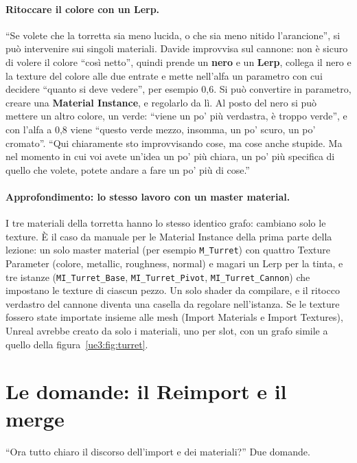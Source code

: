 \paragraph{Ritoccare il colore con un Lerp.} ``Se volete che la torretta sia meno
lucida, o che sia meno nitido l'arancione'', si può intervenire sui singoli materiali.
Davide improvvisa sul cannone: non è sicuro di volere il colore ``così netto'', quindi
prende un \textbf{nero} e un \textbf{Lerp}, collega il nero e la texture del colore alle
due entrate e mette nell'alfa un parametro con cui decidere ``quanto si deve vedere'',
per esempio 0,6. Si può convertire in parametro, creare una \textbf{Material
Instance}, e regolarlo da lì. Al posto del nero si può mettere un altro colore, un
verde: ``viene un po' più verdastra, è troppo verde'', e con l'alfa a 0,8 viene ``questo
verde mezzo, insomma, un po' scuro, un po' cromato''. ``Qui chiaramente sto improvvisando
cose, ma cose anche stupide. Ma nel momento in cui voi avete un'idea un po' più chiara,
un po' più specifica di quello che volete, potete andare a fare un po' più di cose.''

\paragraph{Approfondimento: lo stesso lavoro con un master material.} I tre materiali
della torretta hanno lo stesso identico grafo: cambiano solo le texture. È il caso da
manuale per le Material Instance della prima parte della lezione: un solo master
material (per esempio \texttt{M\_Turret}) con quattro Texture Parameter (colore,
metallic, roughness, normal) e magari un Lerp per la tinta, e tre istanze
(\texttt{MI\_Turret\_Base}, \texttt{MI\_Turret\_Pivot}, \texttt{MI\_Turret\_Cannon}) che
impostano le texture di ciascun pezzo. Un solo shader da compilare, e il ritocco
verdastro del cannone diventa una casella da regolare nell'istanza. Se le texture
fossero state importate insieme alle mesh (Import Materials e Import Textures), Unreal
avrebbe creato da solo i materiali, uno per slot, con un grafo simile a quello della
figura~\ref{ue3:fig:turret}.

\section{Le domande: il Reimport e il merge}
\label{ue3:sec:domande}

``Ora tutto chiaro il discorso dell'import e dei materiali?'' Due domande.

